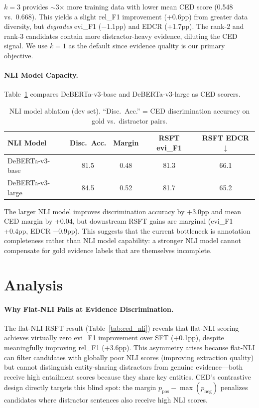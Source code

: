 \documentclass[11pt,a4paper]{article}
\begin{document}
$k{=}3$ provides $\sim$3$\times$ more training data with lower mean CED score (0.548 vs.\ 0.668). This yields a slight rel\_F1 improvement (+0.6pp) from greater data diversity, but \emph{degrades} evi\_F1 ($-$1.1pp) and EDCR (+1.7pp). The rank-2 and rank-3 candidates contain more distractor-heavy evidence, diluting the CED signal. We use $k{=}1$ as the default since evidence quality is our primary objective.

\paragraph{NLI Model Capacity.}
Table~\ref{tab:nli} compares DeBERTa-v3-base and DeBERTa-v3-large as CED scorers.

\begin{table}[t]
\centering
\small
\begin{tabular}{lcccc}
\toprule
\textbf{NLI Model} & \textbf{Disc.\ Acc.} & \textbf{Margin} & \textbf{RSFT evi\_F1} & \textbf{RSFT EDCR}$\downarrow$ \\
\midrule
DeBERTa-v3-base & 81.5 & 0.48 & 81.3 & 66.1 \\
DeBERTa-v3-large & 84.5 & 0.52 & 81.7 & 65.2 \\
\bottomrule
\end{tabular}
\caption{NLI model ablation (dev set). ``Disc.\ Acc.'' = CED discrimination accuracy on gold vs.\ distractor pairs.}
\label{tab:nli}
\end{table}

The larger NLI model improves discrimination accuracy by +3.0pp and mean CED margin by +0.04, but downstream RSFT gains are marginal (evi\_F1 +0.4pp, EDCR $-$0.9pp). This suggests that the current bottleneck is annotation completeness rather than NLI model capability: a stronger NLI model cannot compensate for gold evidence labels that are themselves incomplete.

\section{Analysis}

\paragraph{Why Flat-NLI Fails at Evidence Discrimination.}
The flat-NLI RSFT result (Table~\ref{tab:ced_nli}) reveals that flat-NLI scoring achieves virtually zero evi\_F1 improvement over SFT (+0.1pp), despite meaningfully improving rel\_F1 (+3.6pp). This asymmetry arises because flat-NLI can filter candidates with globally poor NLI scores (improving extraction quality) but cannot distinguish entity-sharing distractors from genuine evidence---both receive high entailment scores because they share key entities. CED's contrastive design directly targets this blind spot: the margin $p_{\text{pos}} - \max(p_{\text{neg}})$ penalizes candidates where distractor sentences also receive high NLI scores.
\end{document}
